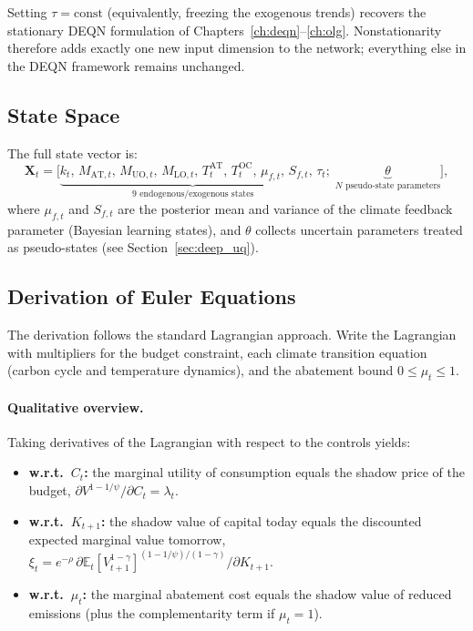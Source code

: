 \documentclass[11pt,a4paper]{report}
\begin{document}
\begin{remarkbox}
Setting $\tau = \mathrm{const}$ (equivalently, freezing the exogenous trends) recovers the stationary DEQN formulation of Chapters~\ref{ch:deqn}--\ref{ch:olg}.  Nonstationarity therefore adds exactly one new input dimension to the network; everything else in the DEQN framework remains unchanged.
\end{remarkbox}

\subsection{State Space}

The full state vector is:
\begin{equation}
\bm{X}_t = \bigl[\underbrace{k_t,\, M_{\mathrm{AT},t},\, M_{\mathrm{UO},t},\, M_{\mathrm{LO},t},\, T^{\mathrm{AT}}_t,\, T^{\mathrm{OC}}_t,\, \mu_{f,t},\, S_{f,t},\, \tau_t}_{9\text{ endogenous/exogenous states}};\; \underbrace{\theta}_{N\text{ pseudo-state parameters}}\bigr],
\label{eq:iam_state}
\end{equation}
where $\mu_{f,t}$ and $S_{f,t}$ are the posterior mean and variance of the climate feedback parameter (Bayesian learning states), and $\theta$ collects uncertain parameters treated as pseudo-states (see Section~\ref{sec:deep_uq}).

\subsection{Derivation of Euler Equations}

The derivation follows the standard Lagrangian approach.  Write the Lagrangian with multipliers for the budget constraint, each climate transition equation (carbon cycle and temperature dynamics), and the abatement bound $0 \leq \mu_t \leq 1$.

\paragraph{Qualitative overview.}
Taking derivatives of the Lagrangian with respect to the controls yields:
\begin{itemize}[itemsep=2pt]
\item \textbf{w.r.t.\ $C_t$:} the marginal utility of consumption equals the shadow price of the budget, $\partial V^{1-1/\psi}/\partial C_t = \lambda_t$.
\item \textbf{w.r.t.\ $K_{t+1}$:} the shadow value of capital today equals the discounted expected marginal value tomorrow, $\xi_t = e^{-\rho}\,\partial \mathbb{E}_t[V_{t+1}^{1-\gamma}]^{(1-1/\psi)/(1-\gamma)} / \partial K_{t+1}$.
\item \textbf{w.r.t.\ $\mu_t$:} the marginal abatement cost equals the shadow value of reduced emissions (plus the complementarity term if $\mu_t = 1$).
\end{itemize}
\end{document}
